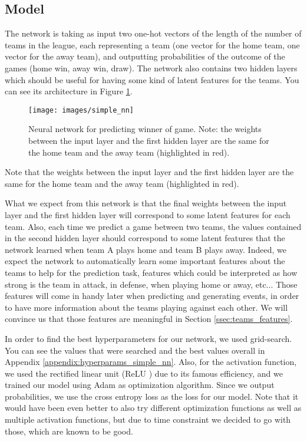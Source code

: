 \documentclass[10pt,conference,onecolumn]{IEEEtran}
\begin{document}
\subsection{Model}\label{ssec:simple_model}
The network is taking as input two one-hot vectors of the length of the number of teams in the league, each representing a team (one vector for the home team, one vector for the away team), and outputting probabilities of the outcome of the games (home win, away win, draw). The network also contains two hidden layers which should be useful for having some kind of latent features for the teams. You can see its architecture in Figure \ref{fig:simple_nn}.

\begin{figure}[H]
\centering
\texttt{[image: images/simple\_nn]}
\caption{Neural network for predicting winner of game. Note: the weights between the input layer and the first hidden layer are the same for the home team and the away team (highlighted in red).}
\label{fig:simple_nn}
\end{figure}

Note that the weights between the input layer and the first hidden layer are the same for the home team and the away team (highlighted in red).

What we expect from this network is that the final weights between the input layer and the first hidden layer will correspond to some latent features for each team. Also, each time we predict a game between two teams, the values contained in the second hidden layer should correspond to some latent features that the network learned when team A plays home and team B plays away. Indeed, we expect the network to automatically learn some important features about the teams to help for the prediction task, features which could be interpreted as how strong is the team in attack, in defense, when playing home or away, etc... Those features will come in handy later when predicting and generating events, in order to have more information about the teams playing against each other. We will convince us that those features are meaningful in Section \ref{ssec:teams_features}.

In order to find the best hyperparameters for our network, we used grid-search. You can see the values that were searched and the best values overall in Appendix \ref{appendix:hyperparams_simple_nn}. Also, for the activation function, we used the rectified linear unit (ReLU \cite{relu}) due to its famous efficiency, and we trained our model using Adam \cite{DBLP:journals/corr/KingmaB14} as optimization algorithm. Since we output probabilities, we use the cross entropy loss as the loss for our model. Note that it would have been even better to also try different optimization functions as well as multiple activation functions, but due to time constraint we decided to go with those, which are known to be good.
\end{document}
